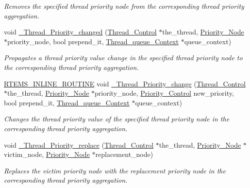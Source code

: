 \begin{DoxyCompactItemize}
\begin{DoxyCompactList}\small\item\em Removes the specified thread priority node from the corresponding thread priority aggregation. \end{DoxyCompactList}\item 
void \mbox{\hyperlink{group__RTEMSScoreThread_ga3c72bf8623d4e8a6b4e5510cdbc4baac}{\+\_\+\+Thread\+\_\+\+Priority\+\_\+changed}} (\mbox{\hyperlink{struct__Thread__Control}{Thread\+\_\+\+Control}} $\ast$the\+\_\+thread, \mbox{\hyperlink{structPriority__Node}{Priority\+\_\+\+Node}} $\ast$priority\+\_\+node, bool prepend\+\_\+it, \mbox{\hyperlink{structThread__queue__Context}{Thread\+\_\+queue\+\_\+\+Context}} $\ast$queue\+\_\+context)
\begin{DoxyCompactList}\small\item\em Propagates a thread priority value change in the specified thread priority node to the corresponding thread priority aggregation. \end{DoxyCompactList}\item 
\mbox{\hyperlink{group__RTEMSScoreBaseDefs_gac216239df231d5dbd15e3520b0b9313f}{R\+T\+E\+M\+S\+\_\+\+I\+N\+L\+I\+N\+E\+\_\+\+R\+O\+U\+T\+I\+NE}} void \mbox{\hyperlink{group__RTEMSScoreThread_ga76a9975ac0b320b0a00678534ab78f10}{\+\_\+\+Thread\+\_\+\+Priority\+\_\+change}} (\mbox{\hyperlink{struct__Thread__Control}{Thread\+\_\+\+Control}} $\ast$the\+\_\+thread, \mbox{\hyperlink{structPriority__Node}{Priority\+\_\+\+Node}} $\ast$priority\+\_\+node, \mbox{\hyperlink{group__RTEMSScorePriority_ga59d02b58072d31a9a1cfe644557aefe2}{Priority\+\_\+\+Control}} new\+\_\+priority, bool prepend\+\_\+it, \mbox{\hyperlink{structThread__queue__Context}{Thread\+\_\+queue\+\_\+\+Context}} $\ast$queue\+\_\+context)
\begin{DoxyCompactList}\small\item\em Changes the thread priority value of the specified thread priority node in the corresponding thread priority aggregation. \end{DoxyCompactList}\item 
void \mbox{\hyperlink{group__RTEMSScoreThread_ga4f0fe1a67da542aa18a7cbb3d4e2f47a}{\+\_\+\+Thread\+\_\+\+Priority\+\_\+replace}} (\mbox{\hyperlink{struct__Thread__Control}{Thread\+\_\+\+Control}} $\ast$the\+\_\+thread, \mbox{\hyperlink{structPriority__Node}{Priority\+\_\+\+Node}} $\ast$victim\+\_\+node, \mbox{\hyperlink{structPriority__Node}{Priority\+\_\+\+Node}} $\ast$replacement\+\_\+node)
\begin{DoxyCompactList}\small\item\em Replaces the victim priority node with the replacement priority node in the corresponding thread priority aggregation. \end{DoxyCompactList}\item 

\end{DoxyCompactItemize}
